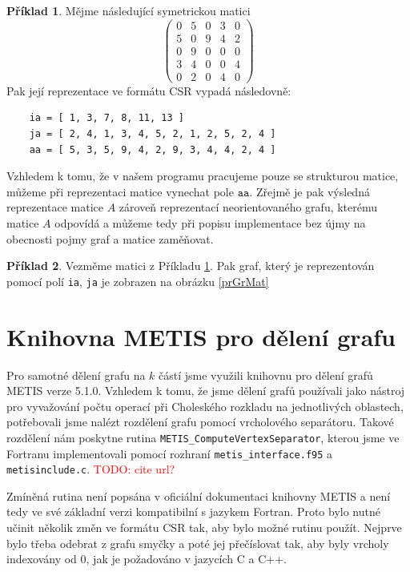 \documentclass[11pt,american,czech,oneside]{book}
\theoremstyle{plain}
\theoremstyle{definition}
\newtheorem{example}{Příklad}
\newcommand{\TODO}[1]{\textcolor{red}{TODO: #1}}
\begin{document}
\begin{example}
  \label{CSRexample}
  Mějme následující symetrickou matici
  \[
    \begin{pmatrix}
      0 & 5 & 0 & 3 & 0 \\
      5 & 0 & 9 & 4 & 2 \\
      0 & 9 & 0 & 0 & 0 \\
      3 & 4 & 0 & 0 & 4 \\
      0 & 2 & 0 & 4 & 0
    \end{pmatrix}
  \]
  Pak její reprezentace ve formátu CSR vypadá následovně:
  \begin{verbatim}
    ia = [ 1, 3, 7, 8, 11, 13 ]
    ja = [ 2, 4, 1, 3, 4, 5, 2, 1, 2, 5, 2, 4 ]
    aa = [ 5, 3, 5, 9, 4, 2, 9, 3, 4, 4, 2, 4 ]
  \end{verbatim}
\end{example}

Vzhledem k tomu, že v našem programu pracujeme pouze se strukturou matice, můžeme při reprezentaci matice vynechat pole $\texttt{aa}$. Zřejmě je pak výsledná reprezentace matice $A$ zároveň reprezentací neorientovaného grafu, kterému matice $A$ odpovídá a můžeme tedy při popisu implementace bez újmy na obecnosti pojmy graf a matice zaměňovat.

\begin{example}
  Vezměme matici z Příkladu \ref{CSRexample}. Pak graf, který je reprezentován pomocí polí \texttt{ia}, \texttt{ja} je zobrazen na obrázku \ref{prGrMat}
\end{example}

\section{Knihovna METIS pro dělení grafu}

Pro samotné dělení grafu na $k$ částí jsme využili knihovnu pro dělení grafů METIS \cite{kary:13} verze 5.1.0. Vzhledem k tomu, že jsme dělení grafů používali jako nástroj pro vyvažování počtu operací při Choleského rozkladu na jednotlivých oblastech, potřebovali jsme nalézt rozdělení grafu pomocí vrcholového separátoru. Takové rozdělení nám poskytne rutina \texttt{METIS\_ComputeVertexSeparator}, kterou jsme ve Fortranu implementovali pomocí rozhraní \texttt{metis\_interface.f95} a \texttt{metisinclude.c}. \TODO{cite url?}

Zmíněná rutina není popsána v oficiální dokumentaci knihovny METIS a není tedy ve své základní verzi kompatibilní s jazykem Fortran. Proto bylo nutné učinit několik změn ve formátu CSR tak, aby bylo možné rutinu použít. Nejprve bylo třeba odebrat z grafu smyčky a poté jej přečíslovat tak, aby byly vrcholy indexovány od 0, jak je požadováno v jazycích C a C++.
\end{document}
